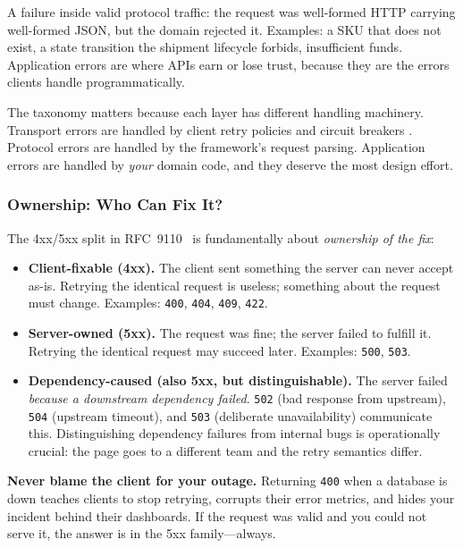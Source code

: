 \begin{definition}
A failure inside valid protocol traffic: the request was well-formed HTTP
carrying well-formed JSON, but the domain rejected it. Examples: a SKU that
does not exist, a state transition the shipment lifecycle forbids,
insufficient funds. Application errors are where APIs earn or lose trust,
because they are the errors clients handle programmatically.
\end{definition}

The taxonomy matters because each layer has different handling machinery.
Transport errors are handled by client retry policies and circuit breakers
\cite{nygard2018releaseit}. Protocol errors are handled by the framework's
request parsing. Application errors are handled by \emph{your} domain code,
and they deserve the most design effort.

\subsubsection{Ownership: Who Can Fix It?}

The 4xx/5xx split in RFC~9110~\cite{rfc9110} is fundamentally about
\emph{ownership of the fix}:

\begin{itemize}
  \item \textbf{Client-fixable (4xx).} The client sent something the server
        can never accept as-is. Retrying the identical request is useless;
        something about the request must change. Examples: \texttt{400},
        \texttt{404}, \texttt{409}, \texttt{422}.
  \item \textbf{Server-owned (5xx).} The request was fine; the server failed
        to fulfill it. Retrying the identical request may succeed later.
        Examples: \texttt{500}, \texttt{503}.
  \item \textbf{Dependency-caused (also 5xx, but distinguishable).} The
        server failed \emph{because a downstream dependency failed}.
        \texttt{502} (bad response from upstream), \texttt{504} (upstream
        timeout), and \texttt{503} (deliberate unavailability) communicate
        this. Distinguishing dependency failures from internal bugs is
        operationally crucial: the page goes to a different team and the
        retry semantics differ.
\end{itemize}

\begin{warningbox}
\textbf{Never blame the client for your outage.} Returning \texttt{400} when
a database is down teaches clients to stop retrying, corrupts their error
metrics, and hides your incident behind their dashboards. If the request was
valid and you could not serve it, the answer is in the 5xx family---always.
\end{warningbox}

